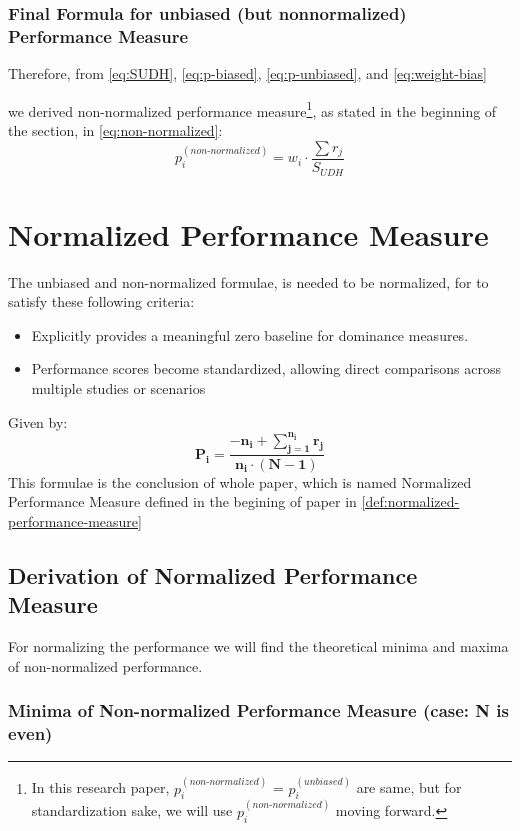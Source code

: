 \documentclass[a4paper,fleqn,review]{cas-sc}
\begin{document}
\subsubsection{Final Formula for unbiased (but non\text{-}normalized) Performance Measure}
Therefore, from \autoref{eq:SUDH}, \autoref{eq:p-biased}, \autoref{eq:p-unbiased}, and \autoref{eq:weight-bias}

we derived non-normalized performance measure\footnote{In this research paper, $p_i^{(non\text{-}normalized)}$ = $p_i^{(unbiased)}$ are same, but for standardization sake, we will use $p_i^{(non\text{-}normalized)}$ moving forward.}, as stated in the beginning of the section, in \autoref{eq:non-normalized}:
\begin{equation}
    p_i^{(non\text{-}normalized)} = w_i \cdot \frac{\sum r_j}{ S_{UDH} }
\label{p-non-normalized}
\end{equation}



\section{Normalized Performance Measure}

The unbiased and non-normalized formulae, is needed to be normalized, for to satisfy these following criteria:
\begin{itemize}
	\item Explicitly provides a meaningful zero baseline for dominance measures.
	\item Performance scores become standardized, allowing direct comparisons across multiple studies or scenarios
\end{itemize}
Given by:
\begin{equation}
	\boxed{
		\mathbf{
			P_i = \frac{-n_i +  \sum\limits_{j=1}^{n_i} r_j}{n_i \cdot (N - 1)}}
	}
\end{equation}
This formulae is the conclusion of whole paper, which is named Normalized Performance Measure defined in the begining of paper in \autoref{def:normalized-performance-measure}

\subsection{Derivation of Normalized Performance Measure}

For normalizing the performance we will find the theoretical minima and maxima of non-normalized performance. 

\subsubsection{Minima of Non-normalized Performance Measure (case: N is even)}
\end{document}
